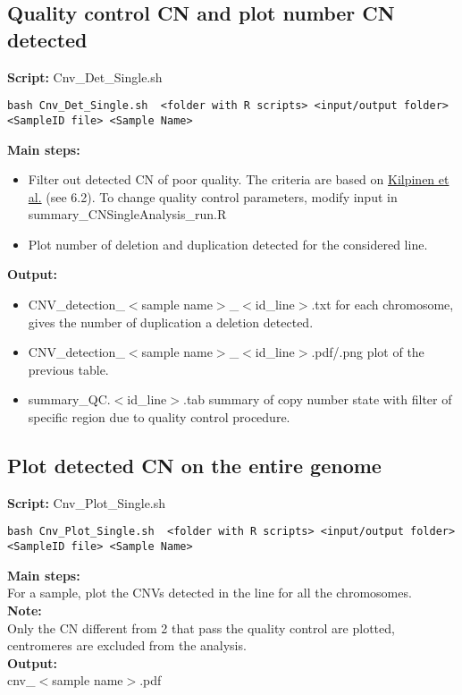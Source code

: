 \documentclass[11pt]{paper}
\begin{document}
\subsection{Quality control CN and plot number CN detected}
\textbf{Script:} Cnv\_Det\_Single.sh
\begin{verbatim}
bash Cnv_Det_Single.sh  <folder with R scripts> <input/output folder> 
<SampleID file> <Sample Name>  
\end{verbatim}
\textbf{Main steps:}
\begin{itemize}
\item Filter out detected CN of poor quality. The criteria are based on \href{https://www.nature.com/articles/nature22403}{Kilpinen et al.} (see 6.2). To change quality control parameters, modify input in summary\_CNSingleAnalysis\_run.R
\item Plot number of deletion and duplication detected for the considered line.
\end{itemize}  
\noindent \textbf{Output:}
\begin{itemize}
\item CNV\_detection\_$<$sample name$>$\_$<$id\_line$>$.txt for each chromosome, gives the number of duplication a deletion detected.
\item CNV\_detection\_$<$sample name$>$\_$<$id\_line$>$.pdf/.png plot of the previous table.
\item  summary\_QC.$<$id\_line$>$.tab summary of copy number state with filter of specific region due to quality control procedure.
\end{itemize}

\subsection{Plot detected CN on the entire genome}
\textbf{Script:} Cnv\_Plot\_Single.sh
\begin{verbatim}
bash Cnv_Plot_Single.sh  <folder with R scripts> <input/output folder> 
<SampleID file> <Sample Name>  
\end{verbatim}
\textbf{Main steps:}\\
For a sample, plot the CNVs detected in the line for all the chromosomes.\\
\noindent \textbf{Note:}\\
Only the CN different from 2 that pass the quality control are plotted, centromeres are excluded from the analysis.\\
\noindent \textbf{Output:}\\
cnv\_$<$sample name$>$.pdf
\end{document}
